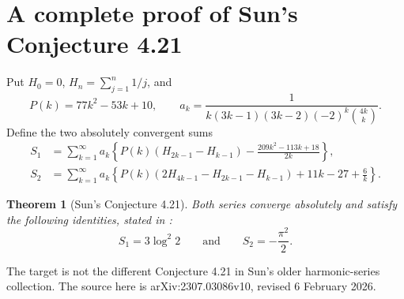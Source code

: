 \documentclass[11pt,a4paper]{article}
\newtheorem{theorem}{Theorem}[section]
\theoremstyle{remark}\newtheorem{remark}[theorem]{Remark}
\numberwithin{equation}{section}
\begin{document}
\section{A complete proof of Sun's Conjecture 4.21}\label{s421:sec:sun421}
Put $H_0=0$, $H_n=\sum_{j=1}^n1/j$, and
\[
 P(k)=77k^2-53k+10,\qquad
 a_k=\frac{1}{k(3k-1)(3k-2)(-2)^k\binom{4k}{k}}.
\]
Define the two absolutely convergent sums
\begin{align}
 S_1&=\sum_{k=1}^{\infty}a_k\left\{
 P(k)(H_{2k-1}-H_{k-1})-\frac{209k^2-113k+18}{2k}\right\},
 \label{s421:eq:S1}\\
 S_2&=\sum_{k=1}^{\infty}a_k\left\{
 P(k)(2H_{4k-1}-H_{2k-1}-H_{k-1})+11k-27+\frac6k\right\}.
 \label{s421:eq:S2}
\end{align}
\begin{theorem}[Sun's Conjecture 4.21]\label{s421:thm:s421-main}
Both series converge absolutely and satisfy the following identities, stated in \cite[p.~20, equations (4.23)--(4.24)]{Sun}:
\begin{equation}\label{s421:eq:original}
 S_1=3\log^2 2\qquad\text{and}\qquad S_2=-\frac{\pi^2}{2}.
\end{equation}
\end{theorem}
The target is not the different Conjecture 4.21 in Sun's older harmonic-series collection. The source here is arXiv:2307.03086v10, revised 6 February 2026.
\end{document}
